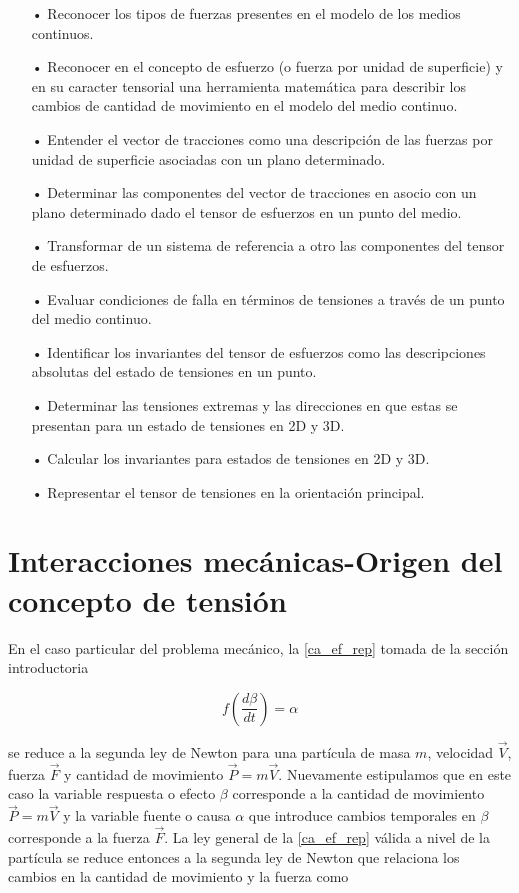 \documentclass[../notas medios.tex]{subfiles}
\begin{document}
\begin{itemize}
\item[•] Reconocer los tipos de fuerzas presentes en el modelo de los medios continuos.
\item[•] Reconocer en el concepto de esfuerzo (o fuerza por unidad de superficie) y en su caracter tensorial una herramienta matemática para describir los cambios de cantidad de movimiento en el modelo del medio continuo.
\item[•] Entender el vector de tracciones como una descripción de las fuerzas por unidad de superficie asociadas con un plano determinado.
\item[•] Determinar las componentes del vector de tracciones en asocio con un plano determinado dado el tensor de esfuerzos en un punto del medio.
\item[•] Transformar de un sistema de referencia a otro las componentes del tensor de esfuerzos.
\item[•] Evaluar condiciones de falla en términos de tensiones a través de un punto del medio continuo. 
\item[•] Identificar los invariantes del tensor de esfuerzos como las descripciones absolutas del estado de tensiones en un punto.
\item[•] Determinar las tensiones extremas y las direcciones en que estas se presentan para un estado de tensiones en 2D y 3D.
\item[•] Calcular los invariantes para estados de tensiones en 2D y 3D.
\item[•] Representar el tensor de tensiones en la orientación principal.
\end{itemize}


\section{Interacciones mecánicas-Origen del concepto de tensión}

En el caso particular del problema mecánico, la \cref{ca_ef_rep} tomada de la sección introductoria

\begin{equation}
f\left( {\frac{{d\beta }}{{dt}}} \right) = \alpha
\label{ca_ef_rep}
\end{equation}

se reduce a la segunda ley de Newton para una partícula de masa $m$, velocidad
$\vec V$, fuerza $\vec F$ y cantidad de movimiento $\vec P = m\vec V$.
Nuevamente estipulamos que en este caso la variable respuesta o efecto $\beta$ 
corresponde a la cantidad de movimiento $\vec P = m\vec V$ y la variable fuente
o causa $\alpha$ que introduce cambios temporales en $\beta$ corresponde a la
fuerza $\vec F$. La ley general de la \cref{ca_ef_rep} válida a nivel de la
partícula se reduce entonces a la segunda ley de Newton que relaciona los
cambios en la cantidad de movimiento y la fuerza como
\end{document}
